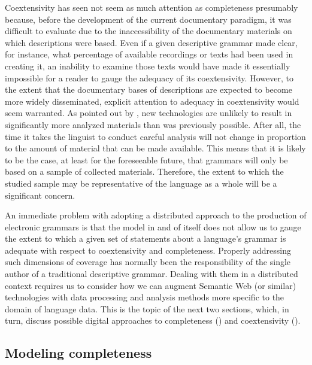 Coextensivity has seen not seem as much attention as completeness presumably
because, before the development of the current documentary paradigm, it was
difficult to evaluate due to the inaccessibility of the documentary materials on
which descriptions were based. Even if a given descriptive grammar made clear,
for instance, what percentage of available recordings or texts had been used in
creating it, an inability to examine those texts would have made it essentially
impossible for a reader to gauge the adequacy of its coextensivity. However, to
the extent that the documentary bases of descriptions are expected to become
more widely disseminated, explicit attention to adequacy in coextensivity would
seem warranted. As pointed out by , new
technologies are unlikely to result in significantly more analyzed materials
than was previously possible. After all, the time it takes the linguist to
conduct careful analysis will not change in proportion to the amount of material
that can be made available. This means that it is likely to be the case, at
least for the foreseeable future, that grammars will only be based on a sample
of collected materials. Therefore, the extent to which the studied sample may be
representative of the language as a whole will be a significant concern.

An immediate problem with adopting a distributed approach to the production of
electronic grammars is that the model in and of itself does not allow us to
gauge the extent to which a given set of statements about a language's grammar
is adequate with respect to coextensivity and completeness. Properly addressing
such dimensions of coverage has normally been the responsibility of the single
author of a traditional descriptive grammar. Dealing with them in a distributed
context requires us to consider how we can augment Semantic Web (or similar)
technologies with data processing and analysis methods more specific to the
domain of language data. This is the topic of the next two sections, which, in
turn, discuss possible digital approaches to completeness
() and coextensivity ().





\subsection{Modeling completeness\label{ModelingExternal}}

